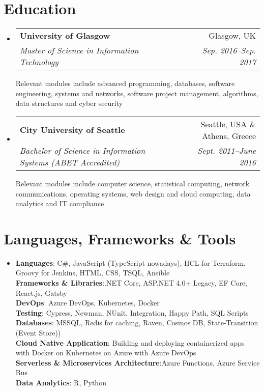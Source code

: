 \documentclass[letterpaper,10pt]{article}
\makeatletter
\newcommand{\resumeItem}[1]{
  \item\small{
    {#1 \vspace{-1pt}}
  }
}
\newcommand{\resumeSubheading}[4]{
  \item
    \begin{tabular*}{0.97\textwidth}[t]{l@{\extracolsep{\fill}}r}
      \textbf{#1} & #2 \\
      \textit{\small#3} & \textit{\small #4} \\
    \end{tabular*}\vspace{1mm}
}
\newcommand{\resumeSubHeadingListStart}{\begin{itemize}[leftmargin=0.15in, label={}]}
\newcommand{\resumeSubHeadingListEnd}{\end{itemize}}
\makeatother
\begin{document}
\section{Education}
  \resumeSubHeadingListStart
    \resumeSubheading
      {University of Glasgow}{Glasgow, UK}
      {Master of Science in Information Technology}{Sep. 2016--Sep. 2017}
      \small{Relevant modules include advanced programming, databases, software engineering, systems and networks, software project management, algorithms, data structures and cyber security}
    \resumeSubheading
      {City University of Seattle}{Seattle, USA \& Athens, Greece}
      {Bachelor of Science in Information Systems (ABET Accredited)}{Sept. 2011--June 2016}
      \small{Relevant modules include computer science, statistical computing, network communications, operating systems, web design and cloud computing, data analytics and IT compliance}
  \resumeSubHeadingListEnd

\section{Languages, Frameworks \& Tools}
  \resumeSubHeadingListStart
    \resumeItem{
      \textbf{Languages}{: C\#, JavaScript (TypeScript nowadays), HCL for Terraform, Groovy for Jenkins, HTML, CSS, TSQL, Ansible} \\[1mm]
      \textbf{Frameworks \& Libraries}{:.NET Core, ASP.NET 4.0+ Legacy, EF Core, React.js, Gatsby} \\[1mm]
      \textbf{DevOps}{: Azure DevOps, Kubernetes, Docker} \\[1mm]
      \textbf{Testing}{: Cypress, Newman, NUnit, Integration, Happy Path, SQL Scripts} \\[1mm]
      \textbf{Databases}{: MSSQL, Redis for caching, Raven, Cosmos DB, State-Transition (Event Store))} \\[1mm]
      \textbf{Cloud Native Application}{: Building and deploying containerized apps with Docker on Kubernetes on Azure with Azure DevOps} \\[1mm]
      \textbf{Serverless \& Microservices Architecture}{:Azure Functions, Azure Service Bus} \\[1mm]
      \textbf{Data Analytics}{: R, Python}
    }
  \resumeSubHeadingListEnd

\end{document}
